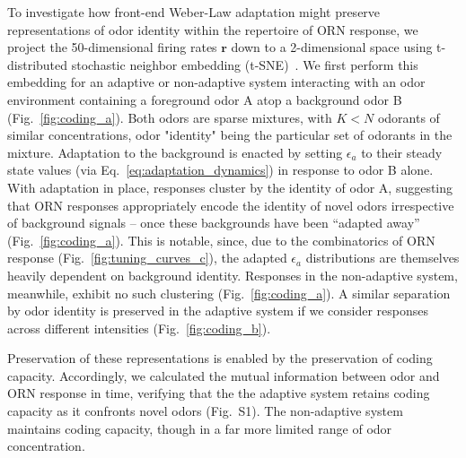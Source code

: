 \documentclass[9pt,twocolumn,twoside]{pnas-new}
\begin{document}
To investigate how front-end Weber-Law adaptation might preserve representations of odor identity within the repertoire of ORN response, we project the 50-dimensional  firing rates $\mathbf r$ down to a 2-dimensional space using t-distributed stochastic neighbor embedding (t-SNE)~\cite{tsne}. We first perform this embedding for an adaptive or non-adaptive system interacting with an odor environment containing a foreground odor A atop a background odor B (Fig.~\ref{fig:coding_a}). Both odors are sparse mixtures, with $K < N$ odorants of similar concentrations, odor "identity" being the particular set of odorants in the mixture. Adaptation to the background is enacted by setting $\epsilon_a$ to their steady state values (via Eq.~\ref{eq:adaptation_dynamics}) in response to odor B alone. With adaptation in place, responses cluster by the identity of odor A, suggesting that ORN responses appropriately encode the identity of novel odors irrespective of background signals -- once these backgrounds have been ``adapted away'' (Fig.~\ref{fig:coding_a}). This is notable, since, due to the combinatorics of ORN response (Fig.~\ref{fig:tuning_curves_c}), the adapted $\epsilon_a$ distributions are themselves heavily dependent on background identity. Responses in the non-adaptive system, meanwhile, exhibit no such clustering (Fig.~\ref{fig:coding_a}).
A similar separation by odor identity is preserved in the adaptive system if we consider responses across different intensities (Fig.~\ref{fig:coding_b}). 

Preservation of these representations is enabled by the preservation of coding capacity. Accordingly, we calculated the mutual information between odor and ORN response in time, verifying that the the adaptive system retains coding capacity as it confronts novel odors (Fig.~S1). The non-adaptive system maintains coding capacity, though in a far more limited range of odor concentration.

\end{document}

